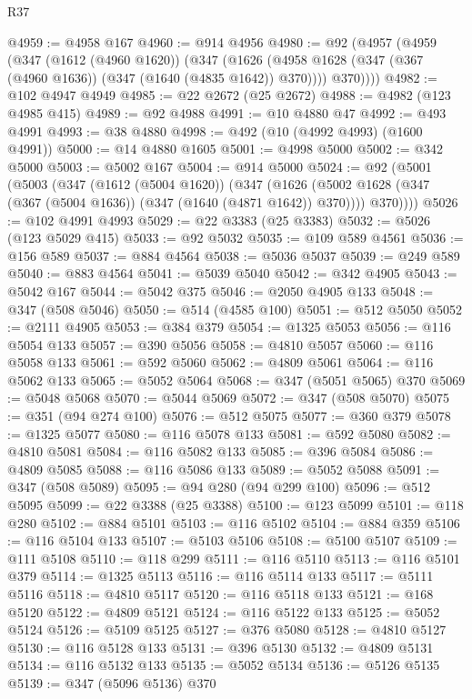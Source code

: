 \begin{lexlean}{R37}
\begin{coremodule}
@4959 := @4958 @167
@4960 := @914 @4956
@4980 := @92
    (@4957
      (@4959
        (@347
          (@1612 (@4960 @1620))
          (@347
            (@1626 (@4958 @1628 (@347 (@367 (@4960 @1636)) (@347 (@1640 (@4835 @1642)) @370))))
            @370))))
@4982 := @102 @4947 @4949
@4985 := @22 @2672 (@25 @2672)
@4988 := @4982 (@123 @4985 @415)
@4989 := @92 @4988
@4991 := @10 @4880 @47
@4992 := @493 @4991
@4993 := @38 @4880
@4998 := @492 (@10 (@4992 @4993) (@1600 @4991))
@5000 := @14 @4880 @1605
@5001 := @4998 @5000
@5002 := @342 @5000
@5003 := @5002 @167
@5004 := @914 @5000
@5024 := @92
    (@5001
      (@5003
        (@347
          (@1612 (@5004 @1620))
          (@347
            (@1626 (@5002 @1628 (@347 (@367 (@5004 @1636)) (@347 (@1640 (@4871 @1642)) @370))))
            @370))))
@5026 := @102 @4991 @4993
@5029 := @22 @3383 (@25 @3383)
@5032 := @5026 (@123 @5029 @415)
@5033 := @92 @5032
@5035 := @109 @589 @4561
@5036 := @156 @589
@5037 := @884 @4564
@5038 := @5036 @5037
@5039 := @249 @589
@5040 := @883 @4564
@5041 := @5039 @5040
@5042 := @342 @4905
@5043 := @5042 @167
@5044 := @5042 @375
@5046 := @2050 @4905 @133
@5048 := @347 (@508 @5046)
@5050 := @514 (@4585 @100)
@5051 := @512 @5050
@5052 := @2111 @4905
@5053 := @384 @379
@5054 := @1325 @5053
@5056 := @116 @5054 @133
@5057 := @390 @5056
@5058 := @4810 @5057
@5060 := @116 @5058 @133
@5061 := @592 @5060
@5062 := @4809 @5061
@5064 := @116 @5062 @133
@5065 := @5052 @5064
@5068 := @347 (@5051 @5065) @370
@5069 := @5048 @5068
@5070 := @5044 @5069
@5072 := @347 (@508 @5070)
@5075 := @351 (@94 @274 @100)
@5076 := @512 @5075
@5077 := @360 @379
@5078 := @1325 @5077
@5080 := @116 @5078 @133
@5081 := @592 @5080
@5082 := @4810 @5081
@5084 := @116 @5082 @133
@5085 := @396 @5084
@5086 := @4809 @5085
@5088 := @116 @5086 @133
@5089 := @5052 @5088
@5091 := @347 (@508 @5089)
@5095 := @94 @280 (@94 @299 @100)
@5096 := @512 @5095
@5099 := @22 @3388 (@25 @3388)
@5100 := @123 @5099
@5101 := @118 @280
@5102 := @884 @5101
@5103 := @116 @5102
@5104 := @884 @359
@5106 := @116 @5104 @133
@5107 := @5103 @5106
@5108 := @5100 @5107
@5109 := @111 @5108
@5110 := @118 @299
@5111 := @116 @5110
@5113 := @116 @5101 @379
@5114 := @1325 @5113
@5116 := @116 @5114 @133
@5117 := @5111 @5116
@5118 := @4810 @5117
@5120 := @116 @5118 @133
@5121 := @168 @5120
@5122 := @4809 @5121
@5124 := @116 @5122 @133
@5125 := @5052 @5124
@5126 := @5109 @5125
@5127 := @376 @5080
@5128 := @4810 @5127
@5130 := @116 @5128 @133
@5131 := @396 @5130
@5132 := @4809 @5131
@5134 := @116 @5132 @133
@5135 := @5052 @5134
@5136 := @5126 @5135
@5139 := @347 (@5096 @5136) @370

\end{coremodule}
\end{lexlean}
